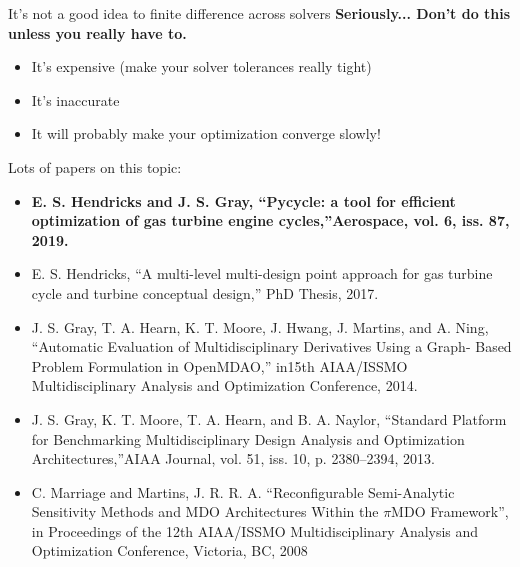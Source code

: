 \documentclass[aspectratio=169, usenames, dvipsnames, 14pt]{beamer}
\begin{document}
 \begin{frame}{It's not a good idea to finite difference across solvers}
\textbf{\small Seriously... Don’t do this unless you really have to.}

\begin{itemize}
    \item \small It’s expensive (make your solver tolerances really tight)
    \item \small It’s inaccurate
    \item \small It will probably make your optimization converge slowly!
\end{itemize}

\small Lots of papers on this topic: 

\tiny {
\begin{itemize}
\item \textbf{E. S. Hendricks and J. S. Gray, “Pycycle: a tool for efficient optimization of gas turbine engine cycles,”Aerospace, vol. 6, iss. 87, 2019.}

\item E. S. Hendricks, “A multi-level multi-design point approach for gas turbine cycle and turbine conceptual design,” PhD Thesis, 2017.

\item J. S. Gray, T. A. Hearn, K. T. Moore, J. Hwang, J. Martins, and A. Ning, “Automatic Evaluation of Multidisciplinary Derivatives Using a Graph-			Based Problem Formulation in OpenMDAO,” in15th AIAA/ISSMO Multidisciplinary Analysis and Optimization Conference, 2014.

\item J. S. Gray, K. T. Moore, T. A. Hearn, and B. A. Naylor, “Standard Platform for Benchmarking Multidisciplinary Design Analysis and Optimization Architectures,”AIAA Journal, vol. 51, iss. 10, p. 2380–2394, 2013.

\item C. Marriage and Martins, J. R. R. A. “Reconfigurable Semi-Analytic Sensitivity Methods and MDO Architectures Within the $\pi$MDO Framework”, in Proceedings of the 12th AIAA/ISSMO Multidisciplinary Analysis and Optimization Conference, Victoria, BC, 2008
\end{itemize}
}

\end{frame}
\end{document}
